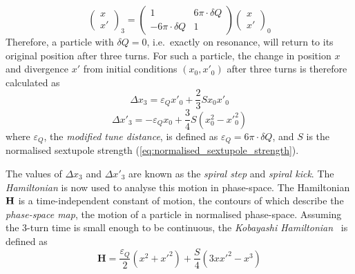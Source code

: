 \documentclass[a4paper,twoside,11pt]{report}
\begin{document}
\begin{equation}
  \begin{pmatrix}
    x\\x'
  \end{pmatrix}_3=
  \begin{pmatrix}
    1 & 6\pi\cdot\delta Q \\
    -6\pi\cdot\delta Q & 1
  \end{pmatrix}\begin{pmatrix}
    x\\x'
  \end{pmatrix}_0
\end{equation}
Therefore, a particle with $\delta Q=0$, i.e.\ exactly on resonance, will return to its original position after three turns. For such a particle, the change in position $x$ and divergence $x'$ from initial conditions $(x_0, x'_0)$ after three turns is therefore calculated as
\begin{equation}
  \Delta x_3 = {\varepsilon_Q} x'_0 + \frac 23 S x_0x'_0
  \label{eq:spiral_step}
\end{equation}
\begin{equation}
  \Delta x'_3 = -{\varepsilon_Q} x_0 + \frac 34 S (x_0^2-x'^2_0)
  \label{eq:spiral_kick}
\end{equation}
where ${\varepsilon_Q}$, the \textit{modified tune distance}, is defined as ${\varepsilon_Q} = 6\pi\cdot\delta Q$, and $S$ is the normalised sextupole strength (\autoref{eq:normalised_sextupole_strength}).

The values of $\Delta x_3$ and $\Delta x'_3$ are known as the \textit{spiral step} and \textit{spiral kick}.
The \textit{Hamiltonian} is now used to analyse this motion in phase-space. The Hamiltonian $\bf H$ is a time-independent constant of motion, the contours of which describe the \textit{phase-space map}, the motion of a particle in normalised phase-space. Assuming the 3-turn time is small enough to be continuous, the \textit{Kobayashi Hamiltonian}~\cite{kobayashi} is defined as
\begin{equation}
  \textbf{H} =\frac{\varepsilon_Q} 2(x^2+x'^2)+\frac S4(3xx'^2-x^3)
\end{equation}
\end{document}
